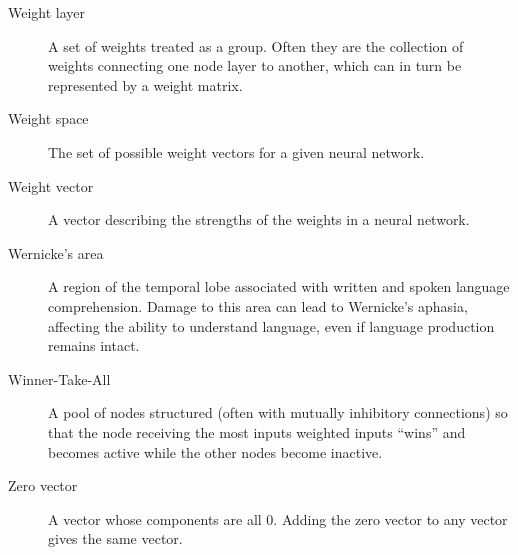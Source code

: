 \begin{description}
\item[Weight layer] A set of weights treated as a group. Often they are the collection of weights connecting one node layer to another, which can in turn be represented by a weight matrix. %

\item[Weight space] The set of possible weight vectors for a given neural network.

\item[Weight vector] A vector describing the strengths of the weights in a neural network.

\item[Wernicke's area] A region of the temporal lobe associated with written and spoken language comprehension. Damage to this area can lead to Wernicke's aphasia, affecting the ability to understand language, even if language production remains intact.

\item[Winner-Take-All] A pool of nodes structured (often with mutually inhibitory connections) so that the node receiving the most inputs weighted inputs ``wins'' and becomes active while the other nodes become inactive.

\item[Zero vector] A vector whose components are all $0$. Adding the zero vector to any vector gives the same vector.

\end{description}